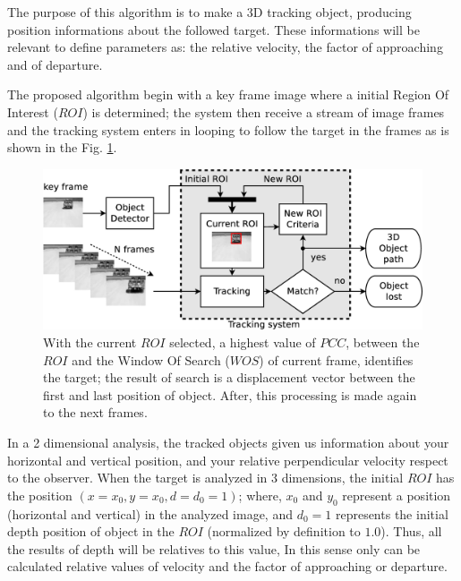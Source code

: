 The purpose of this algorithm is to make a 3D tracking object, producing position informations 
about the followed target.
These informations will be relevant to define parameters 
as: the relative velocity, the factor of approaching and of departure.

The proposed algorithm begin with a key frame image where a initial Region Of Interest ($ROI$) is determined; 
the system then receive a stream of image frames and the tracking system 
enters in looping to follow the target in the frames as is shown in the Fig. \ref{fig:system}.


\begin{figure}[bhp]
\includegraphics[width=\columnwidth]{images/figure1-diagram1.eps}
\caption{With the current $ROI$ selected, a highest value of $PCC$, between the $ROI$ 
and the Window Of Search ($WOS$) of current frame, identifies the target; 
the result of search is a displacement vector
between the first and last position of object. 
After, this processing is made again to the next frames.}
\label{fig:system}
\end{figure}

In a 2 dimensional analysis, the tracked objects given us information about your horizontal 
and vertical position, and your relative perpendicular velocity respect to the observer.
When the target is analyzed in 3 dimensions, 
the initial $ROI$ has the position $(x=x_0,y=x_0,d=d_0=1)$;
where, $x_0$ and $y_0$ represent a position (horizontal and vertical) in the analyzed image,
and $d_0=1$ represents the initial depth position of object in the $ROI$ (normalized by definition to $1.0$).
Thus, all the results of depth will be relatives to this value, 
In this sense only can be calculated relative values of
velocity and the factor of approaching or departure. 

